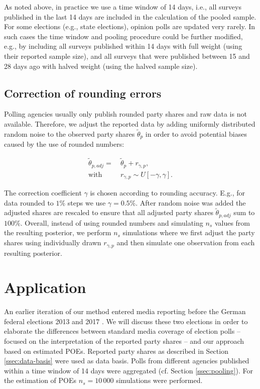 \documentclass[smallcondensed]{svjour3}     %
\begin{document}
As noted above, in practice we use a time window of 14 days, i.e., all surveys
published in the last 14 days are included in the calculation of the pooled
sample. For some elections (e.g., state elections), opinion polls are
updated very rarely. In such cases the time window and pooling procedure
could be further modified, e.g., by including all surveys published within 14 days with full
weight (using their reported sample size), and all surveys that were published
between 15 and 28 days ago with halved weight (using the halved sample size).


\subsection{Correction of rounding errors}\label{ssec:rounding}
Polling agencies usually only publish rounded party shares and
raw data is not available. Therefore, we adjust the reported data by adding
uniformly distributed random noise to the observed party shares $\tilde{\theta}_p$ in order
to avoid potential biases caused by the use of rounded numbers:

\begin{equation}
\begin{aligned}
\tilde{\theta}_{p,adj} = \ &\tilde{\theta}_p + r_{\gamma,p}, \\
\text{with} \ \ \ \ \ &r_{\gamma,p} \sim U[-\gamma,\gamma].
\end{aligned}
\end{equation}

The correction coefficient $\gamma$ is chosen according to rounding accuracy.
E.g., for data rounded to $1\%$ steps we use $\gamma = 0.5\%$. After random noise
was added the adjusted shares are rescaled to ensure that all adjusted party shares
$\tilde{\theta}_{p,adj}$ sum to $100\%$. Overall, instead of using rounded numbers and simulating
$n_s$ values from the resulting posterior, we perform $n_s$ simulations where we
first adjust the party shares using individually drawn $r_{\gamma,p}$ and
then simulate one observation from each resulting posterior.\\


\section{Application} \label{sec:application}
An earlier iteration of our method entered media reporting before the German
federal elections 2013 and 2017 \citep[cf.][]{wahlistik_2013, gelitz_2017}.
We will discuss these two elections in order to elaborate the differences between
standard media coverage of election polls -- focused on the interpretation of the
reported party shares -- and our approach based on estimated POEs. Reported party
shares as described in Section \ref{ssec:data-basis} were used as data basis.
Polls from different agencies published within a time window of 14 days were
aggregated (cf. Section \ref{ssec:pooling}). For the estimation of POEs
$n_{s} = 10\,000$ simulations were performed.
\end{document}
